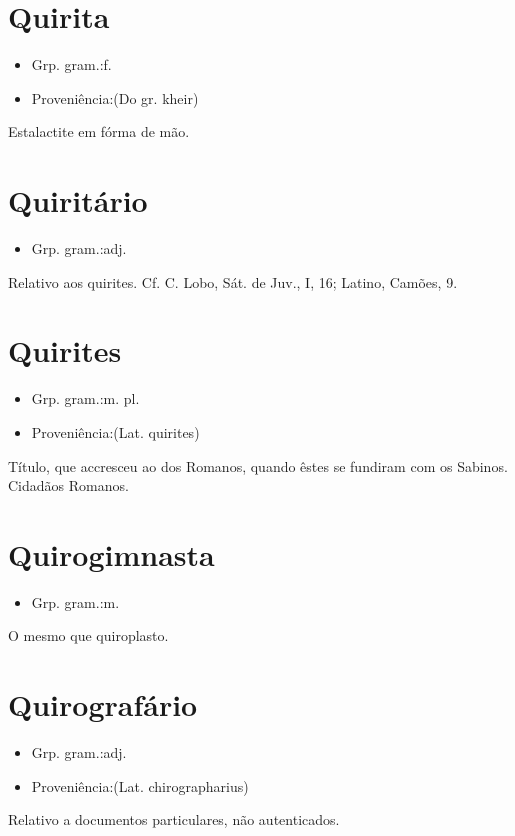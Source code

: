 \section{Quirita}
\begin{itemize}
\item {Grp. gram.:f.}
\end{itemize}
\begin{itemize}
\item {Proveniência:(Do gr. \textunderscore kheir\textunderscore )}
\end{itemize}
Estalactite em fórma de mão.
\section{Quiritário}
\begin{itemize}
\item {Grp. gram.:adj.}
\end{itemize}
Relativo aos quirites. Cf. C. Lobo, \textunderscore Sát. de Juv.\textunderscore , I, 16; Latino, \textunderscore Camões\textunderscore , 9.
\section{Quirites}
\begin{itemize}
\item {Grp. gram.:m. pl.}
\end{itemize}
\begin{itemize}
\item {Proveniência:(Lat. \textunderscore quirites\textunderscore )}
\end{itemize}
Título, que accresceu ao dos Romanos, quando êstes se fundiram com os Sabinos.
Cidadãos Romanos.
\section{Quirogimnasta}
\begin{itemize}
\item {Grp. gram.:m.}
\end{itemize}
O mesmo que \textunderscore quiroplasto\textunderscore .
\section{Quirografário}
\begin{itemize}
\item {Grp. gram.:adj.}
\end{itemize}
\begin{itemize}
\item {Proveniência:(Lat. \textunderscore chirographarius\textunderscore )}
\end{itemize}
Relativo a documentos particulares, não autenticados.
